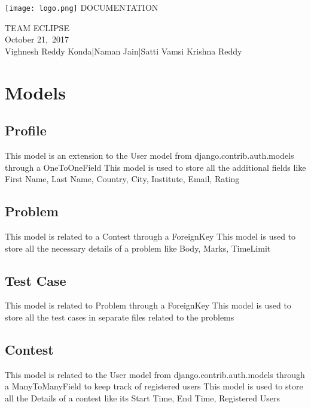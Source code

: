\documentclass[hidelinks, a4paper,12pt, titlepage]{article}
\begin{document}
\afterpage{\restorepagecolor}
\vspace{0pt}
{\center \texttt{[image: logo.png]}}
\vspace{20pt}
{\center \color{white} \fontsize{47}{57}\selectfont DOCUMENTATION\\}
\setmainfont[BoldFont = Lato-Bold.ttf,ItalicFont = Lato-Italic.ttf]{Lato-Regular.ttf}

\vspace{150pt}
{\center \color{white} \fontsize{20}{22}\selectfont TEAM ECLIPSE\\}
\vspace{10pt}
\setmainfont[BoldFont = Lato-Bold.ttf,ItalicFont = Lato-LightItalic.ttf]{Lato-Light.ttf}
{\center \color{white} \fontsize{15}{18}\selectfont October 21,\, 2017\\}
\setmainfont[BoldFont = Lato-Bold.ttf,ItalicFont = Lato-Italic.ttf]{Lato-Regular.ttf}
\vspace{75pt}
{\center \color{white} \fontsize{15}{18}\selectfont Vighnesh Reddy Konda\hfill|\hfill Naman Jain\hfill|\hfill Satti Vamsi Krishna Reddy\\}
\newpage
{ \renewcommand{\baselinestretch}{1.5} 
\tableofcontents
}
\newpage
\section{Models}
\subsection{Profile}
This model is an extension to the User model from django.contrib.auth.models through a OneToOneField
This model is used to store all the additional fields like First Name, Last Name, Country, City, Institute, Email, Rating 
\subsection{Problem}
This model is related to a Contest through a ForeignKey
This model is used to store all the necessary details of a problem like Body, Marks, TimeLimit
\subsection{Test Case}
This model is related to Problem through a ForeignKey
This model is used to store all the test cases in separate files related to the problems
\subsection{Contest}
This model is related to the User model from django.contrib.auth.models through a ManyToManyField to keep track of registered users
This model is used to store all the Details of a contest like its Start Time, End Time, Registered Users
\end{document}
